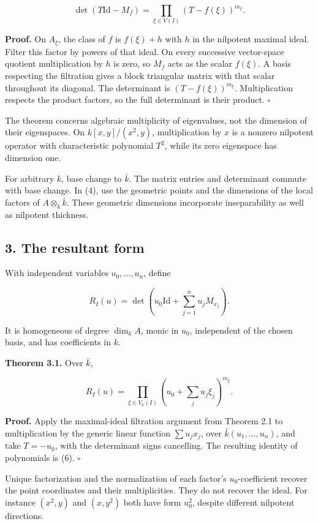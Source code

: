 \documentclass[
]{article}
\begin{document}
\[
\det(T\mathrm{Id}-M_f)=\prod_{\xi\in V(I)}(T-f(\xi))^{m_\xi}.
\tag{4}
\]

\textbf{Proof.} On \(A_\xi\), the class of \(f\) is \(f(\xi)+h\) with
\(h\) in the nilpotent maximal ideal. Filter this factor by powers of
that ideal. On every successive vector-space quotient multiplication by
\(h\) is zero, so \(M_f\) acts as the scalar \(f(\xi)\). A basis
respecting the filtration gives a block triangular matrix with that
scalar throughout its diagonal. The determinant is
\((T-f(\xi))^{m_\xi}\). Multiplication respects the product factors, so
the full determinant is their product. \(\square\)

The theorem concerns algebraic multiplicity of eigenvalues, not the
dimension of their eigenspaces. On \(k[x,y]/(x^2,y)\), multiplication by
\(x\) is a nonzero nilpotent operator with characteristic polynomial
\(T^2\), while its zero eigenspace has dimension one.

For arbitrary \(k\), base change to \(\bar k\). The matrix entries and
determinant commute with base change. In (4), use the geometric points
and the dimensions of the local factors of \(A\otimes_k\bar k\). These
geometric dimensions incorporate inseparability as well as nilpotent
thickness.

\subsection{3. The resultant form}\label{the-resultant-form}

With independent variables \(u_0,\ldots,u_n\), define

\[
R_I(u)=\det\left(u_0\mathrm{Id}+\sum_{j=1}^nu_jM_{x_j}\right).
\tag{5}
\]

It is homogeneous of degree \(\dim_k A\), monic in \(u_0\), independent
of the chosen basis, and has coefficients in \(k\).

\textbf{Theorem 3.1.} Over \(\bar k\),

\[
R_I(u)=\prod_{\xi\in V_{\bar k}(I)}
\left(u_0+\sum_j u_j\xi_j\right)^{m_\xi}.
\tag{6}
\]

\textbf{Proof.} Apply the maximal-ideal filtration argument from Theorem
2.1 to multiplication by the generic linear function \(\sum u_jx_j\),
over \(\bar k(u_1,\ldots,u_n)\), and take \(T=-u_0\), with the
determinant signs cancelling. The resulting identity of polynomials is
(6). \(\square\)

Unique factorization and the normalization of each factor's
\(u_0\)-coefficient recover the point coordinates and their
multiplicities. They do not recover the ideal. For instance \((x^2,y)\)
and \((x,y^2)\) both have form \(u_0^2\), despite different nilpotent
directions.
\end{document}
